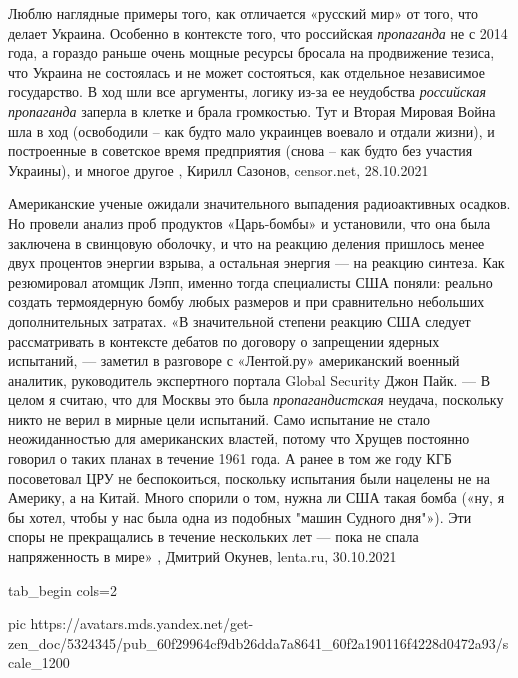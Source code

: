Люблю наглядные примеры того, как отличается «русский мир» от того, что делает
Украина. Особенно в контексте того, что российская \emph{пропаганда} не с 2014 года, а
гораздо раньше очень мощные ресурсы бросала на продвижение тезиса, что Украина
не состоялась и не может состояться, как отдельное независимое государство. В
ход шли все аргументы, логику из-за ее неудобства \emph{российская пропаганда} заперла
в клетке и брала громкостью. Тут и Вторая Мировая Война шла в ход (освободили –
как будто мало украинцев воевало и отдали жизни), и построенные в советское
время предприятия (снова – как будто без участия Украины), и многое другое 
, Кирилл Сазонов, censor.net, 28.10.2021%

Американские ученые ожидали значительного выпадения радиоактивных осадков. Но
провели анализ проб продуктов «Царь-бомбы» и установили, что она была заключена
в свинцовую оболочку, и что на реакцию деления пришлось менее двух процентов
энергии взрыва, а остальная энергия — на реакцию синтеза. Как резюмировал
атомщик Лэпп, именно тогда специалисты США поняли: реально создать термоядерную
бомбу любых размеров и при сравнительно небольших дополнительных затратах.
«В значительной степени реакцию США следует рассматривать в контексте дебатов
по договору о запрещении ядерных испытаний, — заметил в разговоре с «Лентой.ру»
американский военный аналитик, руководитель экспертного портала Global Security
Джон Пайк. — В целом я считаю, что для Москвы это была \emph{пропагандистская}
неудача, поскольку никто не верил в мирные цели испытаний. Само испытание не
стало неожиданностью для американских властей, потому что Хрущев постоянно
говорил о таких планах в течение 1961 года. А ранее в том же году КГБ
посоветовал ЦРУ не беспокоиться, поскольку испытания были нацелены не на
Америку, а на Китай. Много спорили о том, нужна ли США такая бомба («ну, я бы
хотел, чтобы у нас была одна из подобных "машин Судного дня"»). Эти споры не
прекращались в течение нескольких лет — пока не спала напряженность в мире»
, Дмитрий Окунев, lenta.ru, 30.10.2021

\ifcmt
  tab_begin cols=2

     pic https://avatars.mds.yandex.net/get-zen_doc/5324345/pub_60f29964cf9db26dda7a8641_60f2a190116f4228d0472a93/scale_1200


